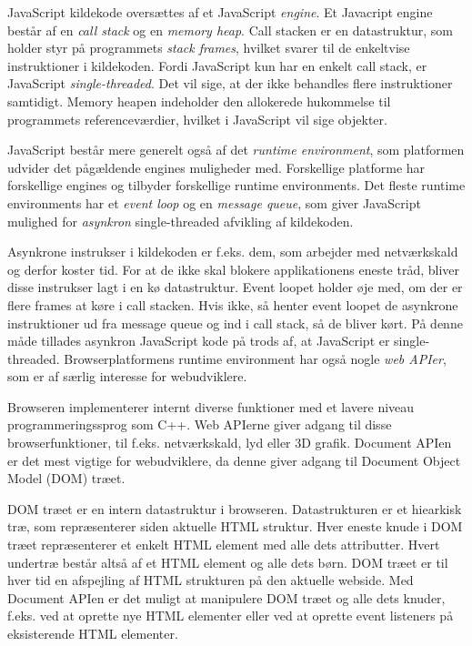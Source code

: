 \documentclass[]{article}
\begin{document}
JavaScript kildekode oversættes af et JavaScript \emph{engine}. Et
Javacript engine består af en \emph{call stack} og en \emph{memory
heap}. Call stacken er en datastruktur, som holder styr på programmets
\emph{stack frames}, hvilket svarer til de enkeltvise instruktioner i
kildekoden. Fordi JavaScript kun har en enkelt call stack, er JavaScript
\emph{single-threaded}. Det vil sige, at der ikke behandles flere
instruktioner samtidigt. Memory heapen indeholder den allokerede
hukommelse til programmets referenceværdier, hvilket i JavaScript vil
sige objekter.

JavaScript består mere generelt også af det \emph{runtime environment},
som platformen udvider det pågældende engines muligheder med.
Forskellige platforme har forskellige engines og tilbyder forskellige
runtime environments. Det fleste runtime environments har et \emph{event
loop} og en \emph{message queue}, som giver JavaScript mulighed for
\emph{asynkron} single-threaded afvikling af kildekoden.

Asynkrone instrukser i kildekoden er f.eks. dem, som arbejder med
netværkskald og derfor koster tid. For at de ikke skal blokere
applikationens eneste tråd, bliver disse instrukser lagt i en kø
datastruktur. Event loopet holder øje med, om der er flere frames at
køre i call stacken. Hvis ikke, så henter event loopet de asynkrone
instruktioner ud fra message queue og ind i call stack, så de bliver
kørt. På denne måde tillades asynkron JavaScript kode på trods af, at
JavaScript er single-threaded. Browserplatformens runtime environment
har også nogle \emph{web APIer}, som er af særlig interesse for
webudviklere.

Browseren implementerer internt diverse funktioner med et lavere niveau
programmeringssprog som C++. Web APIerne giver adgang til disse
browserfunktioner, til f.eks. netværkskald, lyd eller 3D grafik.
Document APIen er det mest vigtige for webudviklere, da denne giver
adgang til Document Object Model (DOM) træet.

DOM træet er en intern datastruktur i browseren. Datastrukturen er et
hiearkisk træ, som repræsenterer siden aktuelle HTML struktur. Hver
eneste knude i DOM træet repræsenterer et enkelt HTML element med alle
dets attributter. Hvert undertræ består altså af et HTML element og alle
dets børn. DOM træet er til hver tid en afspejling af HTML strukturen på
den aktuelle webside. Med Document APIen er det muligt at manipulere DOM
træet og alle dets knuder, f.eks. ved at oprette nye HTML elementer
eller ved at oprette event listeners på eksisterende HTML elementer.
\end{document}
